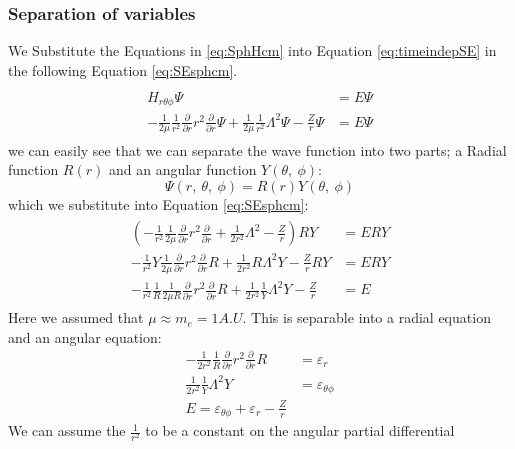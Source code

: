 \documentclass[../master_thesis.tex]{subfiles}
\begin{document}
\subsubsection{Separation of variables}
We Substitute the Equations in \ref{eq:SphHcm} into Equation \ref{eq:timeindepSE}
in the following Equation \ref{eq:SEsphcm}.
\begin{align}\label{eq:SEsphcm}
  \begin{split}
    \hat{H}_{r\theta\phi}\Psi &= E\Psi \\
    -\frac{1}{2\mu}\frac{1}{r^2}\frac{\partial}{\partial r}
          r^2\frac{\partial}{\partial r}\Psi+\frac{1}{2\mu}\frac{1}{r^2}\Lambda^2\Psi-
          \frac{Z}{r}\Psi &= E\Psi
  \end{split}
\end{align}
we can easily see that we can separate the wave function into two parts; a Radial
function $R(r)$ and an angular function $Y(\theta, \ \phi)$:
$$\Psi(r, \ \theta, \ \phi) = R(r)Y(\theta, \ \phi)$$ which we substitute into
Equation \ref{eq:SEsphcm}:
\begin{align}
  \begin{split}
    \left(-\frac{1}{r^2}\frac{1}{2\mu}\frac{\partial}{\partial r}r^2\frac{\partial}{\partial r}+\frac{1}{2r^2}\Lambda^2- \frac{Z}{r}\right)RY &= ERY \\
    -\frac{1}{r^2}Y\frac{1}{2\mu}\frac{\partial}{\partial r}r^2\frac{\partial}{\partial r}R + \frac{1}{2r^2}R\Lambda^2Y - \frac{Z}{r} RY &= ERY \\
    -\frac{1}{r^2}\frac{1}{R}\frac{1}{2\mu R}\frac{\partial}{\partial r}r^2\frac{\partial}{\partial r}R + \frac{1}{2r^2}\frac{1}{Y}\Lambda^2Y - \frac{Z}{r} &= E
  \end{split}
\end{align}
Here we assumed that $\mu \approx m_e = 1 A.U.$
This is separable into a radial equation and an angular equation:
\begin{subequations}
  \begin{align}
    -\frac{1}{2r^2}\frac{1}{R}\frac{\partial}{\partial r}
    r^2\frac{\partial}{\partial r}R &= \varepsilon_r \label{eq:Rpart}\\
    \frac{1}{2r^2}\frac{1}{Y}\Lambda^2Y &= \varepsilon_{\theta\phi}\label{eq:Ypart}\\
    E = \varepsilon_{\theta\phi} + \varepsilon_r  - \frac{Z}{r}
  \end{align}
\end{subequations}
We can assume the $\frac{1}{r^2}$ to be a constant on the angular partial differential
\end{document}
